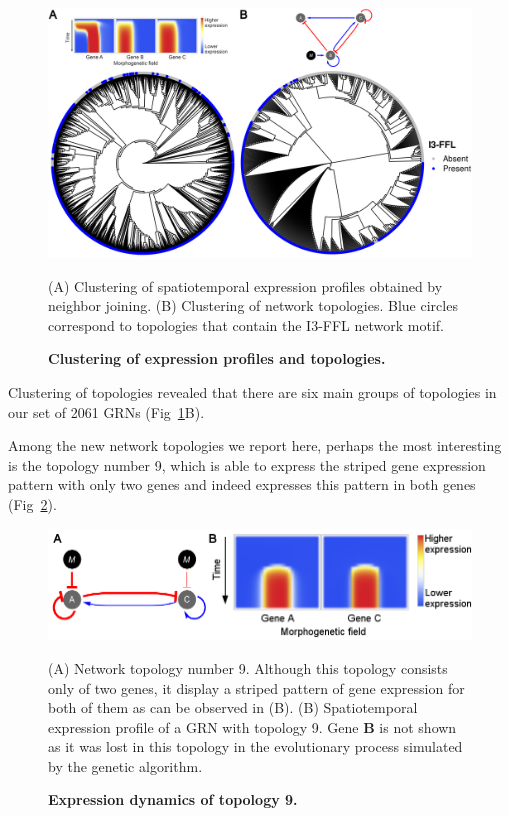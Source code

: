 \documentclass[10pt,letterpaper]{article}
\begin{document}
\begin{figure}[!h]
 \includegraphics[width=\textwidth]{figures/results/Fig7}
 \caption{\bf Clustering of expression profiles and topologies.}
 (A) Clustering of spatiotemporal expression profiles obtained by
 neighbor joining. (B) Clustering of network topologies. Blue circles
 correspond to topologies that contain the I3-FFL network motif.
 \label{fig:clustering}
\end{figure}

Clustering of topologies revealed that there are six main groups of topologies
in our set of 2061 GRNs (Fig~\ref{fig:clustering}B).

Among the new network topologies we report here, perhaps the most interesting
is the topology number 9, which is able to express the striped gene expression
pattern with only two genes and indeed expresses this pattern in both genes
(Fig~\ref{fig:topol9}).

\begin{figure}[!h]
 \includegraphics[width=\textwidth]{figures/results/Fig8}
 \caption{\bf Expression dynamics of topology 9.}
 (A) Network topology number 9. Although this topology consists only of two
 genes, it display a striped pattern of gene expression for both of them as
 can be observed in (B). (B) Spatiotemporal expression profile of a GRN
 with topology 9. Gene \textbf{B} is not shown as it was lost in this topology
 in the evolutionary process simulated by the genetic algorithm.
 \label{fig:topol9}
\end{figure}
\end{document}
